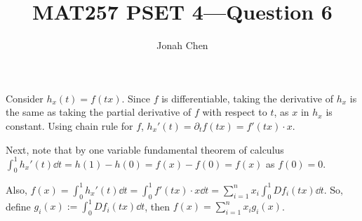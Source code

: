 \documentclass{exam}
\title{MAT257 PSET 4---Question 6}
\author{Jonah Chen}
\numberwithin{equation}{section}
\begin{document}
    \sffamily
    \maketitle
    Consider $h_x(t)=f(tx)$. Since $f$ is differentiable, taking the derivative of $h_x$ is the same as taking the partial derivative of $f$ with respect to $t$, as $x$ in $h_x$ is constant. Using chain rule for $f$,
    $h_x'(t)=\partial_tf(tx)=f'(tx)\cdot x$. 
    
    Next, note that by one variable fundamental theorem of calculus $\int_{0}^1h_x'(t)\dd t=h(1)-h(0)=f(x)-f(0)=f(x)$ as $f(0)=0$.
    
    Also, $f(x)=\int_0^1h_x'(t)\dd t=\int_0^1f'(tx)\cdot x\dd t=\sum_{i=1}^nx_i\int_0^1Df_i(tx)\dd t$. So, define $g_i(x):=\int_0^1Df_i(tx)\dd t$, then $f(x)=\sum_{i=1}^nx_ig_i(x)$.
\end{document}
